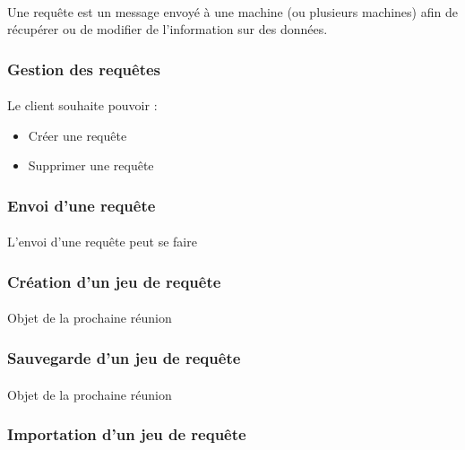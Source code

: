 \documentclass[12pt]{article}
\begin{document}
\paragraph{} Une requête est un message envoyé à une machine (ou plusieurs machines) afin de récupérer ou de modifier de l'information sur des données.

\subsubsection{Gestion des requêtes}

\paragraph{} Le client souhaite pouvoir :
\begin{itemize}
 \item Créer une requête
 \item Supprimer une requête
\end{itemize}

\subsubsection{Envoi d'une requête}
\paragraph{} L'envoi d'une requête peut se faire

\subsubsection{Création d'un jeu de requête}
\paragraph{} Objet de la prochaine réunion

\subsubsection{Sauvegarde d'un jeu de requête}
\paragraph{} Objet de la prochaine réunion

\subsubsection{Importation d'un jeu de requête}
\end{document}
